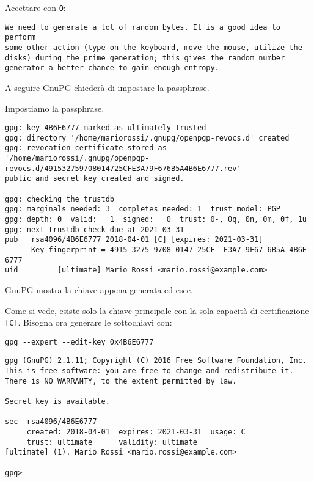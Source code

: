 Accettare con \texttt{O}:

\begin{lstlisting}
We need to generate a lot of random bytes. It is a good idea to perform
some other action (type on the keyboard, move the mouse, utilize the
disks) during the prime generation; this gives the random number
generator a better chance to gain enough entropy.
\end{lstlisting}

A seguire GnuPG chiederà di impostare la passphrase.

Impostiamo la passphrase.

\begin{lstlisting}
gpg: key 4B6E6777 marked as ultimately trusted
gpg: directory '/home/mariorossi/.gnupg/openpgp-revocs.d' created
gpg: revocation certificate stored as '/home/mariorossi/.gnupg/openpgp-revocs.d/491532759708014725CFE3A79F676B5A4B6E6777.rev'
public and secret key created and signed.

gpg: checking the trustdb
gpg: marginals needed: 3  completes needed: 1  trust model: PGP
gpg: depth: 0  valid:   1  signed:   0  trust: 0-, 0q, 0n, 0m, 0f, 1u
gpg: next trustdb check due at 2021-03-31
pub   rsa4096/4B6E6777 2018-04-01 [C] [expires: 2021-03-31]
      Key fingerprint = 4915 3275 9708 0147 25CF  E3A7 9F67 6B5A 4B6E 6777
uid         [ultimate] Mario Rossi <mario.rossi@example.com>
\end{lstlisting}

GnuPG mostra la chiave appena generata ed esce.

Come si vede, esiste solo la chiave principale con la sola capacità di
certificazione \texttt{[C]}. Bisogna ora generare le sottochiavi con:

\begin{lstlisting}
gpg --expert --edit-key 0x4B6E6777
\end{lstlisting}


\begin{lstlisting}
gpg (GnuPG) 2.1.11; Copyright (C) 2016 Free Software Foundation, Inc.
This is free software: you are free to change and redistribute it.
There is NO WARRANTY, to the extent permitted by law.

Secret key is available.

sec  rsa4096/4B6E6777
     created: 2018-04-01  expires: 2021-03-31  usage: C
     trust: ultimate      validity: ultimate
[ultimate] (1). Mario Rossi <mario.rossi@example.com>

gpg>
\end{lstlisting}

